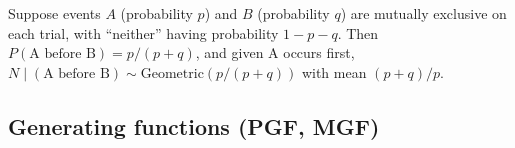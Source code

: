 \begin{remark}
Suppose events $A$ (probability $p$) and $B$ (probability $q$) are mutually exclusive on each trial, with ``neither'' having probability $1-p-q$. Then $P(\text{A before B}) = p/(p+q)$, and given A occurs first, $N \mid (\text{A before B}) \sim \mathrm{Geometric}(p/(p+q))$ with mean $(p+q)/p$.
\end{remark}

\subsection{Generating functions (PGF, MGF)}

